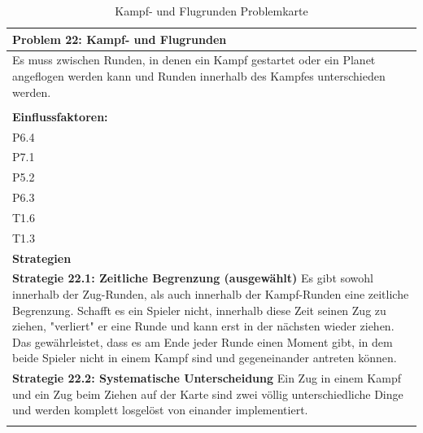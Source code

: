 \documentclass[fontsize=12pt,paper=a4,twoside]{scrartcl}
\begin{document}
\begin{table}[H]
    \centering
    \begin{tabular}{|p{15cm}|}
    \hline
          \textbf{Problem 22: Kampf- und Flugrunden}  \\ \hline
	Es muss zwischen Runden, in denen ein Kampf gestartet oder ein Planet angeflogen werden kann und Runden innerhalb des Kampfes unterschieden werden. \\
         \\ \hline
          \textbf{Einflussfaktoren: } \\
	P6.4 \\	
	P7.1 \\
	P5.2 \\
	P6.3 \\
	T1.6 \\
	T1.3 \\
          \hline
          \textbf{Strategien} \\ \hline
            {}          
           \label{strategie:22.1}     
          \textbf{Strategie 22.1: Zeitliche Begrenzung (ausgewählt)} Es gibt sowohl innerhalb der Zug-Runden, als auch innerhalb der Kampf-Runden eine zeitliche Begrenzung. Schafft es ein Spieler nicht, innerhalb diese Zeit seinen Zug zu ziehen, "verliert" er eine Runde und kann erst in der nächsten wieder ziehen. Das gewährleistet, dass es am Ende jeder Runde einen Moment gibt, in dem beide Spieler nicht in einem Kampf sind und gegeneinander antreten können.   \\        
  {}          
           \label{strategie:22.2}              
          \textbf{Strategie 22.2: Systematische Unterscheidung} Ein Zug in einem Kampf und ein Zug beim Ziehen auf der Karte sind zwei völlig unterschiedliche Dinge und werden komplett losgelöst von einander implementiert.  \\
		 \\ \hline
    \end{tabular}

    \caption{Kampf- und Flugrunden Problemkarte}
    \label{tab:ProblemKarte22}
\end{table}
\end{document}
